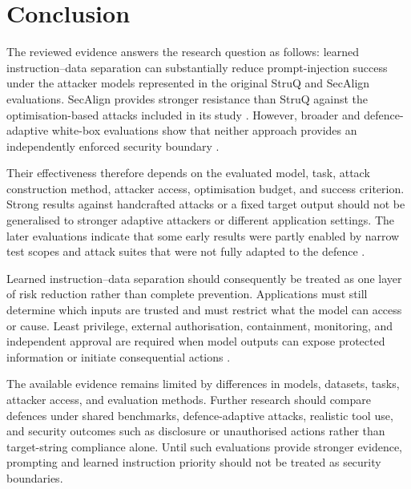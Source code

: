 \section{Conclusion}
\label{sec:conclusion}

The reviewed evidence answers the research question as follows: learned
instruction--data separation can substantially reduce prompt-injection success
under the attacker models represented in the original StruQ and SecAlign
evaluations. SecAlign provides stronger resistance than StruQ against the
optimisation-based attacks included in its study
\parencites{chen2025struq}{chen2025secalign}. However, broader and
defence-adaptive white-box evaluations show that neither approach provides an
independently enforced security boundary
\parencites{jia2025critical}
             {yang2025checkpointgcg}
             {pandya2025astra}.

Their effectiveness therefore depends on the evaluated model, task, attack
construction method, attacker access, optimisation budget, and success
criterion. Strong results against handcrafted attacks or a fixed target output
should not be generalised to stronger adaptive attackers or different
application settings. The later evaluations indicate that some early results
were partly enabled by narrow test scopes and attack suites that were not fully
adapted to the defence
\parencite{jia2025critical}.

Learned instruction--data separation should consequently be treated as one
layer of risk reduction rather than complete prevention. Applications must
still determine which inputs are trusted and must restrict what the model can
access or cause. Least privilege, external authorisation, containment,
monitoring, and independent approval are required when model outputs can expose
protected information or initiate consequential actions
\parencites{owasp2025llm}
             {wu2024systemlevel}
             {debenedetti2024agentdojo}
             {debenedetti2025defeating}.

The available evidence remains limited by differences in models, datasets,
tasks, attacker access, and evaluation methods. Further research should compare
defences under shared benchmarks, defence-adaptive attacks, realistic tool use,
and security outcomes such as disclosure or unauthorised actions rather than
target-string compliance alone. Until such evaluations provide stronger
evidence, prompting and learned instruction priority should not be treated as
security boundaries.